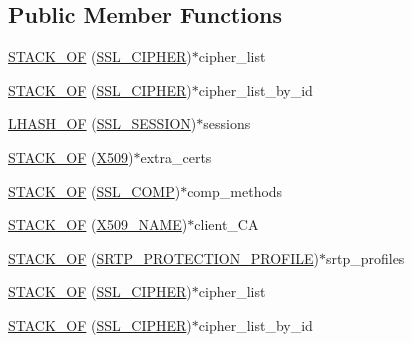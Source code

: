 \subsection*{Public Member Functions}
\begin{DoxyCompactItemize}
\item 
\hyperlink{structssl__ctx__st_a377307a717c91a66a906b6fa3c04b74a}{S\+T\+A\+C\+K\+\_\+\+OF} (\hyperlink{include_2openssl_2ssl_8h_a548d7a5d565a9e0e9bd45c49f8c95701}{S\+S\+L\+\_\+\+C\+I\+P\+H\+ER})$\ast$cipher\+\_\+list
\item 
\hyperlink{structssl__ctx__st_a9b02b6d0b7d24801c1b7e9a57dfebe5d}{S\+T\+A\+C\+K\+\_\+\+OF} (\hyperlink{include_2openssl_2ssl_8h_a548d7a5d565a9e0e9bd45c49f8c95701}{S\+S\+L\+\_\+\+C\+I\+P\+H\+ER})$\ast$cipher\+\_\+list\+\_\+by\+\_\+id
\item 
\hyperlink{structssl__ctx__st_a7cf6ac5c7e612eb562aa2a1a52f5cba3}{L\+H\+A\+S\+H\+\_\+\+OF} (\hyperlink{include_2openssl_2ssl_8h_a8dd6b81bbcb1b2d769235c37779d2a94}{S\+S\+L\+\_\+\+S\+E\+S\+S\+I\+ON})$\ast$sessions
\item 
\hyperlink{structssl__ctx__st_ab41dc9c0f4a22bfac48c06031a355326}{S\+T\+A\+C\+K\+\_\+\+OF} (\hyperlink{crypto_2ossl__typ_8h_a4f666bde6518f95deb3050c54b408416}{X509})$\ast$extra\+\_\+certs
\item 
\hyperlink{structssl__ctx__st_a8207792c72033c18fe3bc519ecbb475a}{S\+T\+A\+C\+K\+\_\+\+OF} (\hyperlink{include_2openssl_2ssl_8h_a4cd5a344b1a968bf05804c52899f21fe}{S\+S\+L\+\_\+\+C\+O\+MP})$\ast$comp\+\_\+methods
\item 
\hyperlink{structssl__ctx__st_a585acf1ac07e11f87fd62186eddd44bf}{S\+T\+A\+C\+K\+\_\+\+OF} (\hyperlink{crypto_2ossl__typ_8h_a5c5fc036757e87b9bd163d0221696533}{X509\+\_\+\+N\+A\+ME})$\ast$client\+\_\+\+CA
\item 
\hyperlink{structssl__ctx__st_adea4ce87fc8b96145c1f17a50805b9d7}{S\+T\+A\+C\+K\+\_\+\+OF} (\hyperlink{include_2openssl_2ssl_8h_ad71374b5a3df5292d0722b703841292e}{S\+R\+T\+P\+\_\+\+P\+R\+O\+T\+E\+C\+T\+I\+O\+N\+\_\+\+P\+R\+O\+F\+I\+LE})$\ast$srtp\+\_\+profiles
\item 
\hyperlink{structssl__ctx__st_a377307a717c91a66a906b6fa3c04b74a}{S\+T\+A\+C\+K\+\_\+\+OF} (\hyperlink{include_2openssl_2ssl_8h_a548d7a5d565a9e0e9bd45c49f8c95701}{S\+S\+L\+\_\+\+C\+I\+P\+H\+ER})$\ast$cipher\+\_\+list
\item 
\hyperlink{structssl__ctx__st_a9b02b6d0b7d24801c1b7e9a57dfebe5d}{S\+T\+A\+C\+K\+\_\+\+OF} (\hyperlink{include_2openssl_2ssl_8h_a548d7a5d565a9e0e9bd45c49f8c95701}{S\+S\+L\+\_\+\+C\+I\+P\+H\+ER})$\ast$cipher\+\_\+list\+\_\+by\+\_\+id

\end{DoxyCompactItemize}
